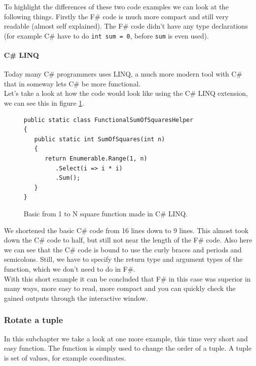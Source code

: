 \documentclass[12pt, a4paper]{article}
\newcommand{\code}[1]{{\small \texttt{#1}}}
\begin{document}
To highlight the differences of these two code examples we can look at the following things. Firstly the F\# code is much more compact and still very readable (almost self explained). The F\# code didn't have any type declarations (for example C\# have to do \code{int sum = 0}, before \code{sum} is even used).
\newpage

\paragraph{C\# LINQ}
Today many C\# programmers uses LINQ, a much more modern tool with C\# that in someway lets C\# be more functional.\\

Let’s take a look at how the code would look like using the C\# LINQ extension, we can see this in figure \ref{fig:SquareFunctionCSharpLINQ}.

\begin{figure}[!h]
\begin{lstlisting}
public static class FunctionalSumOfSquaresHelper
{
   public static int SumOfSquares(int n)
   {
      return Enumerable.Range(1, n)
         .Select(i => i * i)
         .Sum();
   }
}
\end{lstlisting}
\caption{Basic from 1 to N square function made in C\# LINQ.}
\label{fig:SquareFunctionCSharpLINQ}
\end{figure}

We shortened the basic C\# code from 16 lines down to 9 lines. This almost took down the C\# code to half, but still not near the length of the F\# code. Also here we can see that the C\# code is bound to use the  curly braces and periods and semicolons. Still, we have to specify the return type and argument types of the function, which we don't need to do in F\#.\\

With this short example it can be concluded that F\# in this case was superior in many ways, more easy to read, more compact and you can quickly check the gained outputs through the interactive window. 

\newpage
\subsubsection{Rotate a tuple}
In this subchapter we take a look at one more example, this time very short and easy function. The function is simply used to change the order of a tuple. A tuple is set of values, for example coordinates.
   
\end{document}
